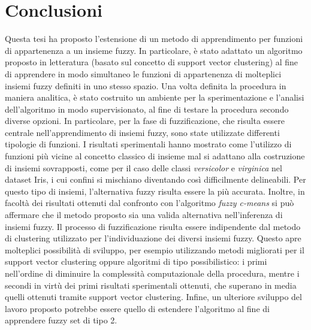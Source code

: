 \documentclass [11pt,a4paper,twoside,openright] {book}
\begin{document}
\chapter*{Conclusioni}
Questa tesi ha proposto l'estensione di un metodo di apprendimento per funzioni di appartenenza a un insieme fuzzy. In particolare, è stato adattato un algoritmo proposto in letteratura (basato sul concetto di support vector clustering) al fine di apprendere in modo simultaneo le funzioni di appartenenza di molteplici insiemi fuzzy definiti in uno stesso spazio. Una volta definita la procedura in maniera analitica, è stato costruito un ambiente per la sperimentazione e l'analisi dell'algoritmo in modo supervisionato, al fine di testare la procedura secondo diverse opzioni. In particolare, per la fase di fuzzificazione, che risulta essere centrale nell'apprendimento di insiemi fuzzy, sono state utilizzate differenti tipologie di funzioni. I risultati sperimentali hanno mostrato come l'utilizzo di funzioni più vicine al concetto classico di insieme mal si adattano alla costruzione di insiemi sovrapposti, come per il caso delle classi \textit{versicolor} e \textit{virginica} nel dataset Iris, i cui confini si mischiano diventando così difficilmente delineabili. Per questo tipo di insiemi, l'alternativa fuzzy risulta essere la più accurata. Inoltre, in facoltà dei risultati ottenuti dal confronto con l'algoritmo \textit{fuzzy c-means} si può affermare che il metodo proposto sia una valida alternativa nell'inferenza di insiemi fuzzy. Il processo di fuzzificazione risulta essere indipendente dal metodo di clustering utilizzato per l'individuazione dei diversi insiemi fuzzy. Questo apre molteplici possibilità di sviluppo, per esempio utilizzando metodi migliorati per il support vector clustering oppure algoritmi di tipo  possibilistico: i primi nell'ordine di diminuire la complessità computazionale della procedura,  mentre i secondi in virtù dei primi risultati sperimentali ottenuti, che superano in media quelli ottenuti tramite support vector clustering. Infine, un ulteriore sviluppo del lavoro proposto potrebbe essere quello di estendere l'algoritmo al fine di apprendere fuzzy set di tipo 2.


\end{document}
